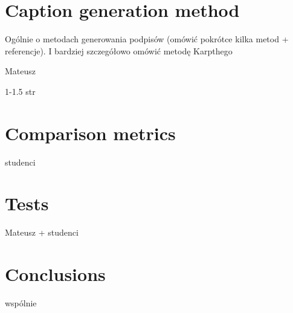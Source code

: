 \documentclass[runningheads]{llncs}
\begin{document}
\section{Caption generation method} 
\cite{7534740}
Ogólnie o metodach generowania podpisów (omówić pokrótce kilka metod + referencje). I bardziej szczegółowo omówić metodę Karpthego

Mateusz

1-1.5 str


\section{Comparison metrics}

studenci

\section{Tests}

Mateusz + studenci

\section{Conclusions}

wspólnie


\end{document}
